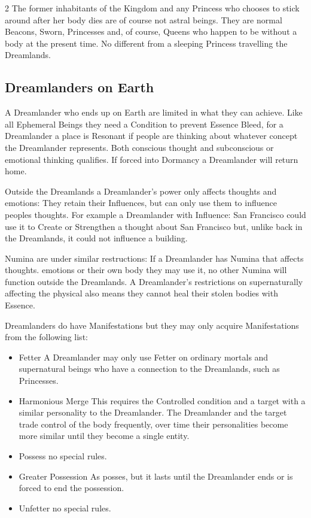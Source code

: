 \begin{multicols}{2}
The former inhabitants of the Kingdom and any Princess who chooses to stick around after her body dies are of course not astral beings. They are normal Beacons, Sworn, Princesses and, of course, Queens who happen to be without a body at the present time. No different from a sleeping Princess travelling the Dreamlands. 

\subsection*{Dreamlanders on Earth}

A Dreamlander who ends up on Earth are limited in what they can achieve. Like all Ephemeral Beings they need a Condition to prevent Essence Bleed, for a Dreamlander a place is Resonant if people are thinking about whatever concept the Dreamlander represents. Both conscious thought and subconscious or emotional thinking qualifies. If forced into Dormancy a Dreamlander will return home. 

Outside the Dreamlands a Dreamlander's power only affects thoughts and emotions: They retain their Influences, but can only use them to influence peoples thoughts. For example a Dreamlander with Influence: San Francisco could use it to Create or Strengthen a thought about San Francisco but, unlike back in the Dreamlands, it could not influence a building. 

Numina are under similar restructions: If a Dreamlander has Numina that affects thoughts. emotions or their own body they may use it, no other Numina will function outside the Dreamlands. A Dreamlander's restrictions on supernaturally affecting the physical also means they cannot heal their stolen bodies with Essence.

Dreamlanders do have Manifestations but they may only acquire Manifestations from the following list: 

\begin{itemize}
 \item Fetter \textendash A Dreamlander may only use Fetter on ordinary mortals and supernatural beings who have a connection to the Dreamlands, such as Princesses.
 \item Harmonious Merge \textendash This requires the Controlled condition and a target with a similar personality to the Dreamlander. The Dreamlander and the target trade control of the body frequently, over time their personalities become more similar until they become a single entity. 
 \item Possess \textendash no special rules. 
 \item Greater Possession \textendash As posses, but it lasts until the Dreamlander ends or is forced to end the possession.
 \item Unfetter \textendash no special rules. 
\end{itemize}


\end{multicols}
